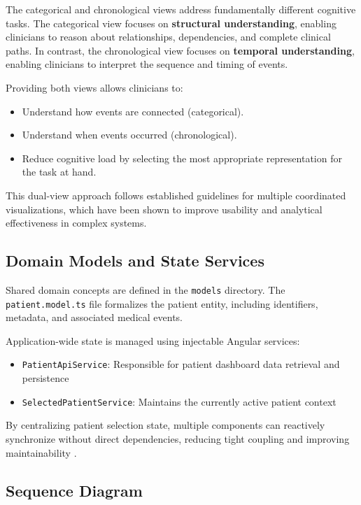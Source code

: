 \documentclass{article}
\begin{document}
The categorical and chronological views address fundamentally different
cognitive tasks. The categorical view focuses on \textbf{structural
    understanding}, enabling clinicians to reason about relationships,
dependencies, and complete clinical paths. In contrast, the chronological view
focuses on \textbf{temporal understanding}, enabling clinicians to interpret
the sequence and timing of events.

Providing both views allows clinicians to:
\begin{itemize}
    \item Understand how events are connected (categorical).
    \item Understand when events occurred (chronological).
    \item Reduce cognitive load by selecting the most appropriate representation for the
          task at hand.
\end{itemize}

This dual-view approach follows established guidelines for multiple coordinated
visualizations, which have been shown to improve usability and analytical
effectiveness in complex systems.

\subsection{Domain Models and State Services}
\label{subsec:state-management}

Shared domain concepts are defined in the \texttt{models} directory. The
\texttt{patient.model.ts} file formalizes the patient entity, including
identifiers, metadata, and associated medical events.

Application-wide state is managed using injectable Angular services:

\begin{itemize}
    \item \texttt{PatientApiService}: Responsible for patient dashboard data retrieval and persistence
    \item \texttt{SelectedPatientService}: Maintains the currently active patient context
\end{itemize}

By centralizing patient selection state, multiple components can reactively
synchronize without direct dependencies, reducing tight coupling and improving
maintainability \cite{angularDocs}.

\subsection{Sequence Diagram}
\end{document}

